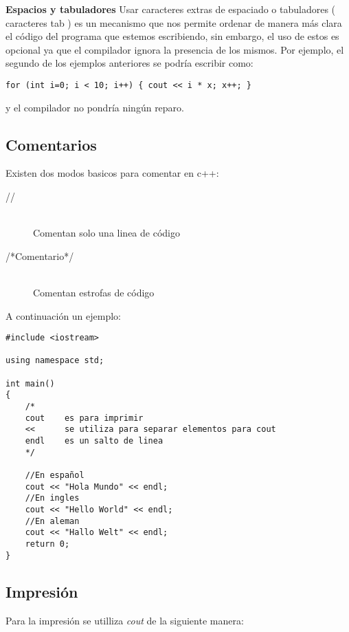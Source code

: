 \textbf{Espacios y tabuladores}
Usar caracteres extras de espaciado o tabuladores ( caracteres tab ) es un mecanismo que nos permite ordenar de manera más clara el código del programa que estemos escribiendo, sin embargo, el uso de estos es opcional ya que el compilador ignora la presencia de los mismos. Por ejemplo, el segundo de los ejemplos anteriores se podría escribir como:

\begin{lstlisting}[style=Cpp, label=sintaxis, caption=Sintaxis]
for (int i=0; i < 10; i++) { cout << i * x; x++; }
\end{lstlisting}

y el compilador no pondría ningún reparo.


\subsection{Comentarios}

Existen dos modos basicos para comentar en c++:
\begin{description}
\item [//] \hfill \\
Comentan solo una linea de código 
\item [/*Comentario*/] \hfill \\
Comentan estrofas de código
\end{description}

A continuación un ejemplo:

\begin{lstlisting}[style=Cpp, label=comentarios, caption=Comentarios]
#include <iostream>

using namespace std;

int main()
{
    /*
    cout    es para imprimir
    <<      se utiliza para separar elementos para cout
    endl    es un salto de linea
    */

    //En español
    cout << "Hola Mundo" << endl;
    //En ingles
    cout << "Hello World" << endl;
    //En aleman
    cout << "Hallo Welt" << endl;
    return 0;
}
\end{lstlisting}


\subsection{Impresión}

Para la impresión se utilliza \textit{cout} de la siguiente manera:

